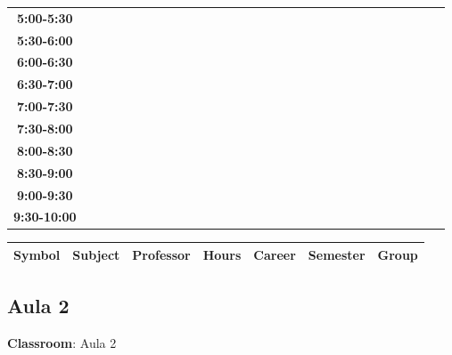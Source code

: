 \documentclass{article}
\begin{document}
\begin{table}[ht]
\begin{tabular}{|c|c|c|c|c|c|c|c|c|c|c|c|c|c|c|c|c|c|c|c|c|c|c|c|c|c|c|c|c|c|}
\cline{1-8} 
\textbf{5:00-5:30} &   &   &   &   &   &   &   \\
\cline{1-8} 
\textbf{5:30-6:00} &   &   &   &   &   &   &   \\
\cline{1-8} 
\textbf{6:00-6:30} &   &   &   &   &   &   &   \\
\cline{1-8} 
\textbf{6:30-7:00} &   &   &   &   &   &   &   \\
\cline{1-8} 
\textbf{7:00-7:30} &   &   &   &   &   &   &   \\
\cline{1-8} 
\textbf{7:30-8:00} &   &   &   &   &   &   &   \\
\cline{1-8} 
\textbf{8:00-8:30} &   &   &   &   &   &   &   \\
\cline{1-8} 
\textbf{8:30-9:00} &   &   &   &   &   &   &   \\
\cline{1-8} 
\textbf{9:00-9:30} &   &   &   &   &   &   &   \\
\cline{1-8} 
\textbf{9:30-10:00} &   &   &   &   &   &   &   \\
\cline{1-8} 
\end{tabular}\end{table}


\begin{longtable}{|c|p{4cm}|p{4cm}|c|c|c|c|}
\hline
\textbf{Symbol} & \textbf{Subject} & \textbf{Professor} & \textbf{Hours} & \textbf{Career} & \textbf{Semester} & \textbf{Group} \\
\hline
\end{longtable}

\newpage


\subsection{Aula 2}
\vspace*{.1cm}

\begin{flushright}
{\LARGE \textbf{Classroom}: Aula 2}
\end{flushright}
\vspace{1cm}
\end{document}
